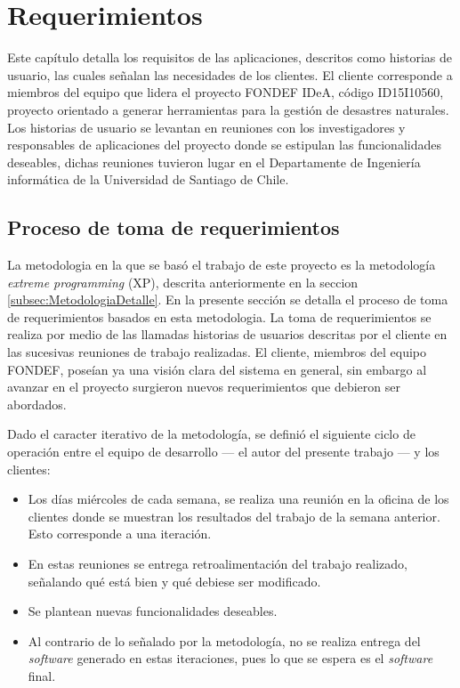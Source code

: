 \chapter{Requerimientos}
\label{cap:Requerimientos}

Este capítulo detalla los requisitos de las aplicaciones, descritos como historias de usuario, las cuales señalan las necesidades de los clientes. El cliente corresponde a miembros del equipo que lidera el proyecto FONDEF IDeA, código ID15I10560, proyecto orientado a generar herramientas para la gestión de desastres naturales. Los historias de usuario se levantan en reuniones con los investigadores y responsables de aplicaciones del proyecto donde se estipulan las funcionalidades deseables, dichas reuniones tuvieron lugar en el Departamente de Ingeniería informática de la Universidad de Santiago de Chile.

\section{Proceso de toma de requerimientos}
\label{sec:tomaDeRequerimientos}

La metodologia en la que se basó el trabajo de este proyecto es la metodología \textit{extreme programming} (XP), descrita anteriormente en la seccion \ref{subsec:MetodologiaDetalle}. En la presente sección se detalla el proceso de toma de requerimientos basados en esta metodologia. La toma de requerimientos se realiza por medio de las llamadas historias de usuarios descritas por el cliente en las sucesivas reuniones de trabajo realizadas.
El cliente, miembros del equipo FONDEF, poseían ya una visión clara del sistema en general, sin embargo al avanzar en el proyecto surgieron nuevos requerimientos que debieron ser abordados.

Dado el caracter iterativo de la metodología, se definió el siguiente ciclo de operación entre el equipo de desarrollo — el autor del presente trabajo — y los clientes:

\begin{itemize}
\item Los días miércoles de cada semana, se realiza una reunión en la oficina de los clientes donde se muestran los resultados del trabajo de la semana anterior. Esto corresponde a una iteración.
\item En estas reuniones se entrega retroalimentación del trabajo realizado, señalando qué está bien y qué debiese ser modificado.
\item Se plantean nuevas funcionalidades deseables.
\item Al contrario de lo señalado por la metodología, no se realiza entrega del \textit{software} generado en estas iteraciones, pues lo que se espera es el \textit{software} final.
\end{itemize}

